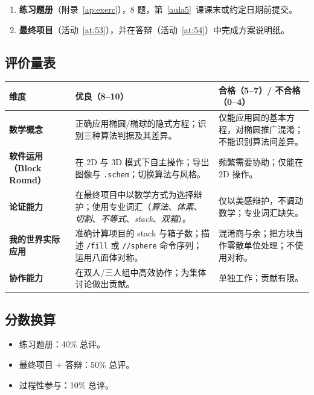 \documentclass[12pt,a4paper]{scrartcl}
\newcommand{\cmd}[1]{\textcolor{earth}{\texttt{\small #1}}}
\begin{document}
\begin{enumerate}[leftmargin=1.5em,itemsep=0.2em,topsep=0.3em,nosep]
  \item \textbf{练习题册}（附录~\ref{ap:exerc}），8 题，第~\ref{aula5}~课课末或约定日期前提交。
  \item \textbf{最终项目}（活动~\ref{at:53}），并在答辩（活动~\ref{at:54}）中完成方案说明纸。
\end{enumerate}

\subsection{评价量表}

\begin{center}
\small
\begin{tabularx}{\textwidth}{@{}p{}XX@{}}
\toprule
\textbf{维度} & \textbf{优良（8--10）} & \textbf{合格（5--7）/ 不合格（0--4）} \\
\midrule
\textbf{数学概念} & 正确应用椭圆/椭球的隐式方程；识别三种算法判据及其差异。 & 仅能应用圆的基本方程，对椭圆推广混淆；不能识别算法间差异。 \\
\addlinespace[3pt]
\textbf{软件运用（Block Round）} & 在 2D 与 3D 模式下自主操作；导出图像与 \texttt{.schem}；切换算法与风格。 & 频繁需要协助；仅能在 2D 操作。 \\
\addlinespace[3pt]
\textbf{论证能力} & 在最终项目中以数学方式为选择辩护；使用专业词汇（\emph{算法}、\emph{体素}、\emph{切割}、\emph{不等式}、\emph{stack}、\emph{双箱}）。 & 仅以美感辩护，不调动数学；专业词汇缺失。 \\
\addlinespace[3pt]
\textbf{我的世界实际应用} & 准确计算项目的 stack 与箱子数；描述 \cmd{/fill} 或 \cmd{//sphere} 命令序列；运用八面体对称。 & 混淆商与余；把方块当作零散单位处理；不使用对称。 \\
\addlinespace[3pt]
\textbf{协作能力} & 在双人/三人组中高效协作；为集体讨论做出贡献。 & 单独工作；贡献有限。 \\
\bottomrule
\end{tabularx}
\end{center}

\subsection{分数换算}
\begin{itemize}[leftmargin=1.3em,itemsep=0.1em,topsep=0.2em,nosep]
  \item 练习题册：40\% 总评。
  \item 最终项目 + 答辩：50\% 总评。
  \item 过程性参与：10\% 总评。
\end{itemize}
\end{document}

